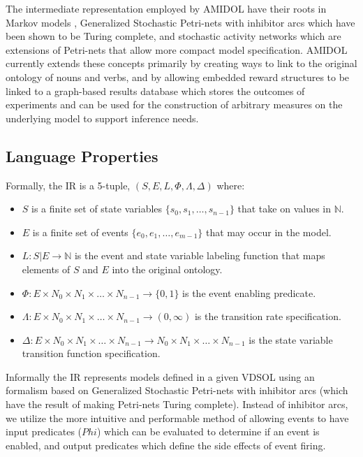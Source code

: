 \documentclass[11pt]{article}
\newcommand{\amidol}{\textsc{AMIDOL}}
\begin{document}
The intermediate representation employed by \amidol{} have their roots in Markov models \cite{howard2012dynamic}, Generalized Stochastic Petri-nets with inhibitor arcs \cite{chiola1993generalized} which have been shown to be Turing complete, and stochastic activity networks \cite{movaghar1985performability,sanders2000stochastic} which are extensions of Petri-nets that allow more compact model specification.  \amidol{} currently extends these concepts primarily by creating ways to link to the original ontology of nouns and verbs, and by allowing embedded reward structures to be linked to a graph-based results database which stores the outcomes of experiments and can be used for the construction of arbitrary measures on the underlying model to support inference needs.


\subsection{Language Properties}

Formally, the IR is a 5-tuple, $(S, E, L, \Phi, \Lambda, \Delta)$ where:
\begin{itemize}
\item $S$ is a finite set of state variables $\{s_0, s_1, \ldots, s_{n-1}\}$ that take on values in $\mathbb{N}$.
\item $E$ is a finite set of events $\{e_0, e_1, \ldots, e_{m-1}\}$ that may occur in the model.
\item $L: S|E \rightarrow \mathbb{N}$ is the event and state variable labeling function that maps elements of $S$ and $E$ into the original ontology.
\item $\Phi: E \times N_0 \times N_1 \times \ldots \times N_{n-1} \rightarrow \{0, 1\}$ is the event enabling predicate.
\item $\Lambda: E \times N_0 \times N_1 \times \ldots \times N_{n-1} \rightarrow (0, \infty)$ is the transition rate specification.
\item $\Delta: E \times N_0 \times N_1 \times \ldots \times N_{n-1} \rightarrow N_0 \times N_1 \times \ldots \times N_{n-1}$ is the state variable transition function specification.
\end{itemize}

Informally the IR represents models defined in a given VDSOL using an formalism based on Generalized Stochastic Petri-nets with inhibitor arcs (which have the result of making Petri-nets Turing complete).  Instead of inhibitor arcs, we utilize the more intuitive and performable method of allowing events to have input predicates ($Phi$) which can be evaluated to determine if an event is enabled, and output predicates which define the side effects of event firing.
\end{document}

